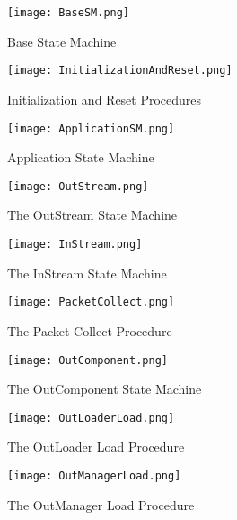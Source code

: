 \documentclass{pnp_article}
\begin{document}
\begin{figure}[h]
 \centering
 \texttt{[image: BaseSM.png]}
 \caption{Base State Machine}
 \label{fig:BaseSM}
\end{figure}

\begin{figure}[h]
 \centering
 \texttt{[image: InitializationAndReset.png]}
 \caption{Initialization and Reset Procedures}
 \label{fig:InitializationAndReset}
\end{figure}

\begin{figure}[h]
 \centering
 \texttt{[image: ApplicationSM.png]}
 \caption{Application State Machine}
 \label{fig:ApplicationSM}
\end{figure}

\begin{figure}[h]
 \centering
 \texttt{[image: OutStream.png]}
 \caption{The OutStream State Machine}
 \label{fig:OutStream}
\end{figure}

\begin{figure}[h]
 \centering
 \texttt{[image: InStream.png]}
 \caption{The InStream State Machine}
 \label{fig:InStream}
\end{figure}

\begin{figure}[h]
 \centering
 \texttt{[image: PacketCollect.png]}
 \caption{The Packet Collect Procedure}
 \label{fig:PacketCollect}
\end{figure}

\begin{figure}[h]
 \centering
 \texttt{[image: OutComponent.png]}
 \caption{The OutComponent State Machine}
 \label{fig:OutComponent}
\end{figure}

\begin{figure}[h]
 \centering
 \texttt{[image: OutLoaderLoad.png]}
 \caption{The OutLoader Load Procedure}
 \label{fig:OutLoaderLoad}
\end{figure}

\begin{figure}[h]
 \centering
 \texttt{[image: OutManagerLoad.png]}
 \caption{The OutManager Load Procedure}
 \label{fig:OutManagerLoad}
\end{figure}
\end{document}
